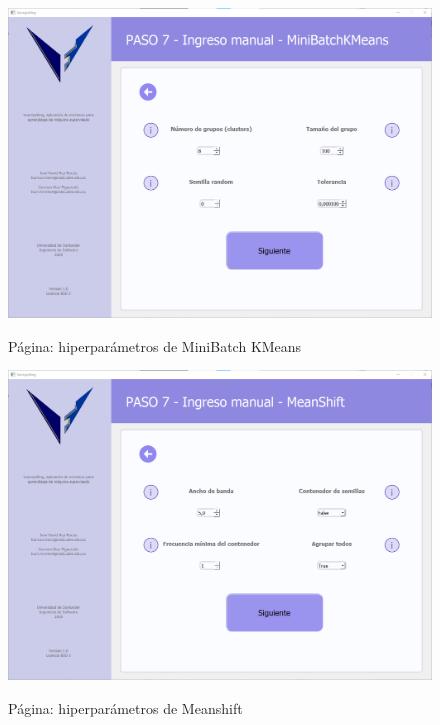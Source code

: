 \begin{figure}[H]
    \centering
    \caption{Página: hiperparámetros de MiniBatch KMeans}
    \includegraphics[width=\textwidth]{images/minibatch_kmeans.png}
    \label{fig:minibatchkmeans}
\end{figure}

\begin{figure}[H]
    \centering
    \caption{Página: hiperparámetros de Meanshift}
    \includegraphics[width=\textwidth]{images/meanshift.png}
    \label{fig:meanshift}
\end{figure}